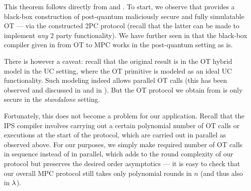 This theorem follows directly from  and \cite{C:IshPraSah08}. To start, we observe that  provides a black-box construction of post-quantum maliciously secure and fully simulatable OT --- via the constructed 2PC protocol (recall that the latter can be made to implement {\em any} 2 party functionality). We have further seen in  that the black-box compiler given in \cite{C:IshPraSah08} from OT to MPC works in the post-quantum setting as is.  

There is however a caveat: recall that the original \cite{C:IshPraSah08} result is in the OT hybrid model in the UC setting, where the OT primitive is modeled as an ideal UC functionality. Such modeling indeed allows parallel OT calls (this has been observed and discussed in \cite[Section 7]{C:CCLY22} and in ). But the OT protocol we obtain from  is only secure in the {\em standalone} setting. 

Fortunately, this does not become a problem for our application. Recall that the IPS compiler involves carrying out a certain polynomial number of OT calls or executions at the start of the protocol, which are carried out in parallel as observed above. For our purposes, we simply make required number of OT calls in sequence instead of in parallel, which adds to the round complexity of our protocol but preserves the desired order asymptotics --- it is easy to check that our overall MPC protocol still takes only polynomial rounds in $n$ (and thus also in $\lambda$).